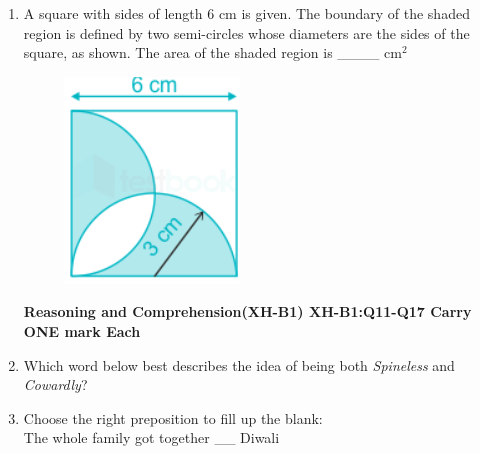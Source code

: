 \documentclass[12pt]{article}
\theoremstyle{remark}
\begin{document}
\begin{enumerate}
\hfill{}
\item A square with sides of length 6 cm is given. The boundary of the shaded region is defined by two semi-circles whose diameters are the sides of the square, as shown. The area of the shaded region is \_\_\_\_ cm$^2$
\begin{centering}
\begin{figure}
\includegraphics{Figs/Q10.png}\\
\caption{}
\label{Fig:1.3}
\end{figure} 
\end{centering}
\begin{enumerate}  \end{enumerate}
\hfill{}
\newpage
\textbf{Reasoning and Comprehension(XH-B1)\newline 
XH-B1:Q11-Q17 Carry ONE mark Each}
\item  Which word below best describes the idea of being both \textit{Spineless} and \textit{Cowardly}?\\ 
\begin{enumerate}  \end{enumerate}
\hfill{}
\item   Choose the right preposition to fill up the blank: \\
 The whole family got together \_\_ Diwali \\ 
 \begin{enumerate} 
\end{enumerate}
\end{enumerate}
\end{document}
